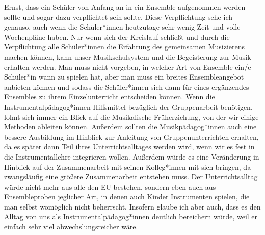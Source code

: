 Ernst, dass ein Schüler von Anfang an in ein Ensemble aufgenommen werden sollte
und sogar dazu verpflichtet sein sollte.
\autocite[61]{ernst:die_zukunftsfaehige_musikschule} Diese Verpflichtung sehe
ich genauso, auch wenn die Schüler*innen heutzutage sehr wenig Zeit und volle
Wochenpläne haben. Nur wenn sich der Kreislauf schließt und durch die
Verpflichtung alle Schüler*innen die Erfahrung des gemeinsamen Musizierens machen
können, kann unser Musikschulsystem und die Begeisterung zur Musik erhalten
werden. Man muss nicht vorgeben, in welcher Art von Ensemble ein/e Schüler*in wann zu
spielen hat, aber man muss ein breites Ensembleangebot anbieten können und
sodass die Schüler*innen sich dann für eines ergänzendes Ensembles zu ihrem Einzelunterricht
entscheiden können. Wenn die Instrumentalpädagog*innen Hilfsmittel bezüglich der
Gruppenarbeit benötigen, lohnt sich immer ein Blick auf die Musikalische
Früherziehung, von der wir einige Methoden ableiten können. Außerdem sollten die
Musikpädagog*innen auch eine bessere Ausbildung im Hinblick zur Anleitung von
Gruppenunterrichten erhalten, da es später dann Teil ihres Unterrichtsalltages
werden wird, wenn wir es fest in die Instrumentallehre integrieren wollen.
Außerdem würde es eine Veränderung in Hinblick auf der Zusammenarbeit mit seinen
Kolleg*innen mit sich bringen, da zwangsläufig eine größere Zusammenarbeit
entstehen muss. Der Unterrichtsalltag würde nicht mehr aus alle den EU bestehen,
sondern eben auch aus Ensembleproben jeglicher Art, in denen auch Kinder
Instrumenten spielen, die man selbst womöglich nicht beherrscht. Insofern glaube
ich aber auch, dass es den Alltag von uns als Instrumentalpädagog*innen deutlich
bereichern würde, weil er einfach sehr viel abwechslungsreicher wäre. 














